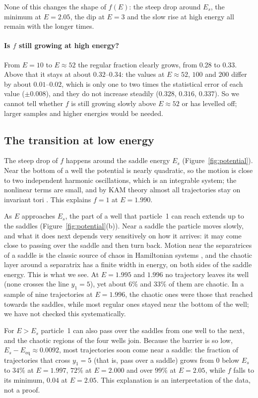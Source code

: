 \documentclass[11pt,a4paper]{article}
\newcommand{\Eeq}{E_{\mathrm{eq}}}
\begin{document}
None of this changes the shape of $f(E)$: the steep drop around $E_s$, the
minimum at $E=2.05$, the dip at $E=3$ and the slow rise at high energy all
remain with the longer times.

\paragraph{Is $f$ still growing at high energy?}
From $E=10$ to $E\approx52$ the regular fraction clearly grows, from $0.28$ to
$0.33$. Above that it stays at about $0.32$--$0.34$: the values at $E\approx52$,
$100$ and $200$ differ by about $0.01$--$0.02$, which is only one to two times
the statistical error of each value ($\pm0.008$), and they do not increase
steadily ($0.328$, $0.316$, $0.337$). So we cannot tell whether $f$ is still
growing slowly above $E\approx52$ or has levelled off; larger samples and
higher energies would be needed.

\subsection{The transition at low energy}\label{sec:transition}
The steep drop of $f$ happens around the saddle energy $E_s$
(Figure~\ref{fig:potential}). Near the bottom of a well the potential is
nearly quadratic, so the motion is close to two independent harmonic
oscillations, which is an integrable system; the nonlinear terms are small,
and by KAM theory almost all trajectories stay on invariant tori
\cite{lichtenberg1992}. This explains $f=1$ at $E=1.990$.

As $E$ approaches $E_s$, the part of a well that particle~1 can reach extends
up to the saddles (Figure~\ref{fig:potential}(b)). Near a saddle the particle
moves slowly, and what it does next depends very sensitively on how it
arrives: it may come close to passing over the saddle and then turn back.
Motion near the separatrices of a saddle is the classic source of chaos in
Hamiltonian systems \cite{lichtenberg1992}, and the chaotic layer around a
separatrix has a finite width in energy, on both sides of the saddle energy.
This is what we see. At $E=1.995$ and $1.996$ no trajectory leaves its well
(none crosses the line $y_1=5$), yet about $6\%$ and $33\%$ of them are
chaotic. In a sample of nine trajectories at $E=1.996$, the chaotic ones were
those that reached towards the saddles, while most regular ones stayed near
the bottom of the well; we have not checked this systematically.

For $E>E_s$ particle~1 can also pass over the saddles from one well to the
next, and the chaotic regions of the four wells join. Because the barrier is
so low, $E_s-\Eeq\approx0.0092$, most trajectories soon come near a saddle:
the fraction of trajectories that cross $y_1=5$ (that is, pass over a saddle)
grows from $0$ below $E_s$ to $34\%$ at $E=1.997$, $72\%$ at $E=2.000$ and
over $99\%$ at $E=2.05$, while $f$ falls to its minimum, $0.04$ at $E=2.05$.
This explanation is an interpretation of the data, not a proof.
\end{document}
